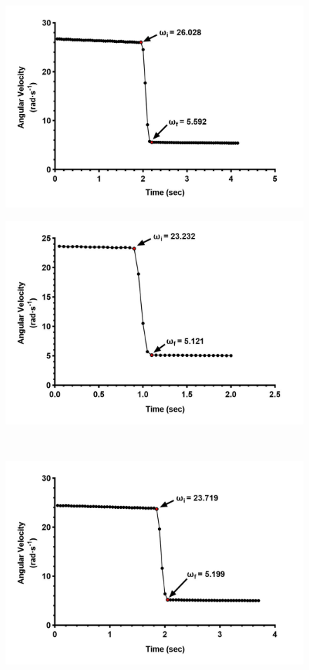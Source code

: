 \begin{figure}[!htb]
	\centering
	\begin{minipage}{.5\textwidth}
		\centering
		\includegraphics[width=\linewidth]{r1}
		\label{fig:test1}
	\end{minipage}%
	\begin{minipage}{.5\textwidth}
		\centering
		\includegraphics[width=\linewidth]{r2}
		\label{fig:test2}
	\end{minipage}\\
	\begin{minipage}{.5\textwidth}
	\centering
	\includegraphics[width=\linewidth]{r3}

\end{minipage}
\end{figure}
